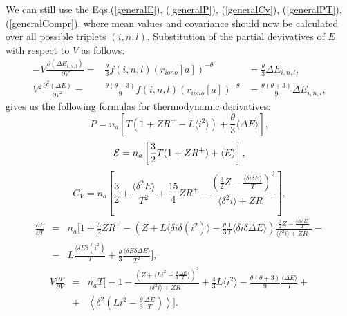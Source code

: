 We can still use the
Eqs.(\ref{generalE}), (\ref{generalP}), (\ref{generalCv}),
(\ref{generalPT}), (\ref{generalCompr}), where mean values and
covariance should now be calculated over all possible triplets $(i, n, l)$.
Substitution of the partial devivatives of $E$ with respect to $V$ as follows:
\begin{eqnarray}
-V \frac{\partial (\Delta E_{i,n,l})}{\partial V} =&
\frac{\theta}{3} f(i,n,l) (r_{iono}[a])^{-\theta} &=
\frac{\theta}{3} \Delta E_{i,n,l}, \\
V^2 \frac{\partial^2 (\Delta E)}{\partial V^2} =&
\frac{\theta (\theta + 3)}{9} f(i,n,l) (r_{iono}[a])^{-\theta} &=
\frac{\theta (\theta + 3)}{9} \Delta E_{i,n,l},
\end{eqnarray}
gives us the following formulas for thermodynamic derivatives:
\begin{equation}
P = n_a \left[ T(1 + ZR^+ - L \langle i^2 \rangle) +
\frac{\theta}{3} \langle \Delta E \rangle \right],
\end{equation}
\begin{equation}
{\cal E} = n_a \left[ \frac32 T (1 + ZR^+) + \langle E \rangle \right],
\end{equation}
\begin{equation}
C_V = n_a \left[ \frac32 + \frac{\langle \delta^2 E \rangle}{T^2} +
\frac{15}{4} ZR^+ - \frac{(\frac32 Z - \frac{\langle \delta i \delta E \rangle}{T})^2}
{\langle \delta^2 i \rangle + ZR^-} \right],
\end{equation}
\begin{eqnarray}
\nonumber \frac{\partial P}{\partial T} &=& n_a \Biggl[ 1 + \frac52 ZR^+ -
 \left( Z + L \langle \delta i \delta (i^2) \rangle
- \frac{\theta}{3} \frac{1}{T} \langle \delta i \delta \Delta E \rangle \right)
\frac{\frac32 Z - \frac{\langle \delta i \delta E \rangle}{T}}
{\langle \delta^2 i \rangle + ZR^-} - \\
&-& L \frac{\langle \delta E \delta (i^2)}{T} +
\frac{\theta}{3} \frac{\langle \delta E \delta \Delta E \rangle}{T^2} \Biggr],
\end{eqnarray}
\begin{eqnarray}
\nonumber V \frac{\partial P}{\partial V} &=& n_a T \Biggl[ -1 -
\frac{(Z + \langle Li^2 - \frac{\theta}{3} \frac{\Delta E}{T} \rangle)^2}
{\langle \delta^2 i \rangle + ZR^-} +
\frac43 L \langle i^2 \rangle -
\frac{\theta (\theta+3)}{9} \frac{\langle \Delta E \rangle}{T} + \\
&+& \left\langle \delta^2 \left( Li^2 - \frac{\theta}{3} \frac{\Delta E}{T} \right) \right\rangle \Biggr].
\end{eqnarray}
